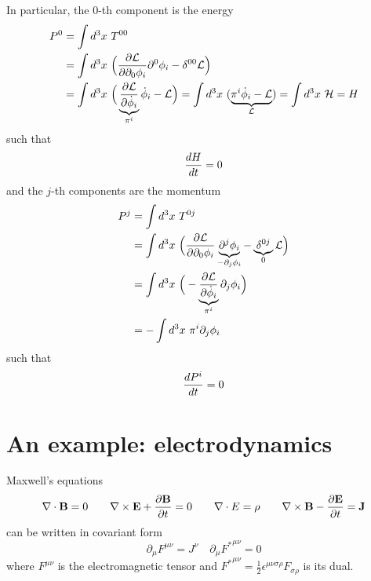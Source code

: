     In particular, the $0$-th component is the energy 
    \begin{equation*}
    \begin{aligned}
        P^0 & = \int d^3 x ~ T^{00} \\ & = \int d^3 x ~ \Big ( \frac{\partial\mathcal L}{\partial\partial_0 \phi_i} \partial^0 \phi_i - \delta^{0 0} \mathcal L \Big) \\ & = \int d^3 x ~ \Big ( \underbrace{\frac{\partial\mathcal L}{\partial\dot \phi_i}}_{\pi^i} \dot \phi_i - \mathcal L \Big ) = \int d^3 x ~ (\underbrace{\pi^i \dot \phi_i - \mathcal L}_{\mathcal L}) = \int d^3 x ~ \mathcal H = H
    \end{aligned}
    \end{equation*}
    such that 
    \begin{equation*}
        \frac{dH}{dt} = 0
    \end{equation*} 
    and the $j$-th components are the momentum 
    \begin{equation*}
    \begin{aligned}
        P^j & = \int d^3 x ~ T^{0j} \\ & = \int d^3 x ~ \Big ( \frac{\partial\mathcal L}{\partial\partial_0 \phi_i} \underbrace{\partial^j \phi_i}_{-\partial_j \phi_i} - \underbrace{\delta^{0j}}_0 \mathcal L \Big) \\ & = \int d^3 x ~ \Big ( - \underbrace{\frac{\partial\mathcal L}{\partial\dot \phi_i}}_{\pi^i} \partial_j \phi_i \Big) \\ & = - \int d^3 x ~ \pi^i \partial_j \phi_i
    \end{aligned}
    \end{equation*}
    such that 
    \begin{equation*}
        \frac{dP^i}{dt} = 0
    \end{equation*}

\chapter{An example: electrodynamics}

    Maxwell's equations 
    \begin{equation}\label{eqmax}
        \nabla \cdot \mathbf B = 0 \qquad \nabla \times \mathbf E + \frac{\partial\mathbf B}{\partial t} = 0 \qquad \nabla \cdot E = \rho \qquad \nabla \times \mathbf B - \frac{\partial\mathbf E}{\partial t} = \mathbf J
    \end{equation}
    can be written in covariant form 
    \begin{equation*}
        \partial_\mu F^{\mu\nu} = J^\nu \quad \partial_\mu {F^*}^{\mu\nu} = 0
    \end{equation*}
    where $F^{\mu\nu}$ is the electromagnetic tensor and ${F^*}^{\mu\nu} = \frac{1}{2} \epsilon^{\mu\nu\sigma\rho} F_{\sigma\rho}$ is its dual. 

